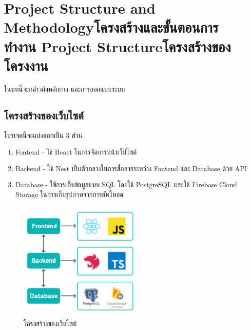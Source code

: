 \chapter{\ifproject%
\ifenglish Project Structure and Methodology\else โครงสร้างและขั้นตอนการทำงาน\fi
\else%
\ifenglish Project Structure\else โครงสร้างของโครงงาน\fi
\fi
}

ในบทนี้จะกล่าวถึงหลักการ และการออกแบบระบบ

\makeatletter


\makeatother

\section{โครงสร้างของเว็บไซต์}
โปรเจคนี้จะแบ่งออกเป็น 3 ส่วน
\begin{enumerate}
  \item Fontend - ใช้ React ในการจัดการหน้าเว็ปไซต์
  \item Backend - ใช้ Nest เป็นตัวกลางในการสื่อสารระหว่าง Fontend และ Database ด้วย API
  \item Database - ใช้การเก็บข้อมูลแบบ SQL โดยใช้ PostgreSQL และใช้ Firebase Cloud Storage ในการเก็บรูปภาพจากการอัพโหลด
\end{enumerate}

\begin{figure}[h]
  \begin{center}
  \includegraphics[width=6cm,height=6cm,keepaspectratio]{SWAReal.png}
  \end{center}
  \caption[โครงสร้างของเว็บไซต์]{โครงสร้างของเว็บไซต์}
  \label{fig:โครงสร้างของเว็บไซต์}
\end{figure}


